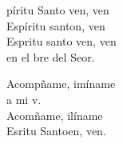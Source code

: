 \begin{cancion}%
	\begin{chorus}%
	píritu Santo ven, ven\\
	Espíritu santon, ven\\
	Espritu santo ven, ven\\
	en el bre del Seor.\\
	\end{chorus}%
	Acompñame, imíname\\
	a mi v.\\
	Acomñame, ilíname \\
	Esritu Santoen, ven.\\
\end{cancion}%
